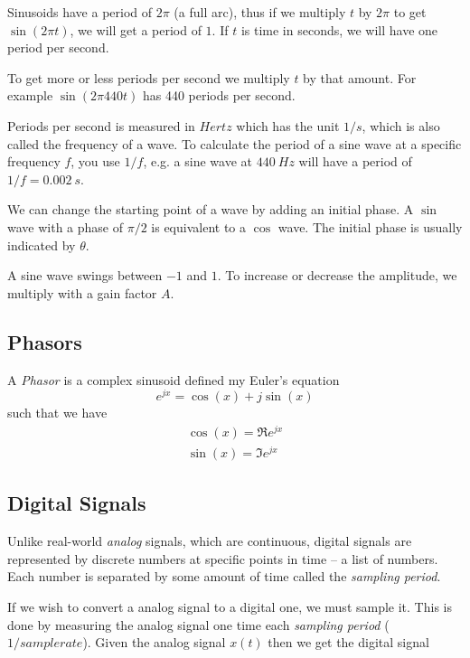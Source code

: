 \documentclass[11pt]{article}
\begin{document}
Sinusoids have a period of $2 \pi$ (a full arc), thus if we multiply $t$ by $2\pi$ to get $\sin(2 \pi t)$, we will get a period of $1$. If $t$ is time in seconds, we will have one period per second.

To get more or less periods per second we multiply $t$ by that amount. For example $\sin(2 \pi 440 t)$ has 440 periods per second.

Periods per second is measured in $Hertz$ which has the unit $1/s$, which is also called the frequency of a wave. To calculate the period of a sine wave at a specific frequency $f$, you use $1/f$, e.g. a sine wave at $440\ Hz$ will have a period of $1/f=0.002\ s$.

We can change the starting point of a wave by adding an initial phase. A $\sin$ wave with a phase of $\pi/2$ is equivalent to a $\cos$ wave. The initial phase is usually indicated by $\theta$.

A sine wave swings between $-1$ and $1$. To increase or decrease the amplitude, we multiply with a gain factor $A$.

\subsection{Phasors}
A \textit{Phasor} is a complex sinusoid defined my Euler's equation
\begin{equation}
    e^{jx} = \cos(x) + j\sin(x)
\end{equation}
such that we have
\begin{align}
    \cos(x) = \Re{e^{jx}}\\
    \sin(x) = \Im{e^{jx}}
\end{align}

\subsection{Digital Signals}
Unlike real-world \textit{analog} signals, which are continuous, digital signals are represented by discrete numbers at specific points in time -- a list of numbers. Each number is separated by some amount of time called the \textit{sampling period}.

If we wish to convert a analog signal to a digital one, we must sample it. This is done by measuring the analog signal one time each \textit{sampling period} ($1/samplerate$). Given the analog signal $x(t)$ then we get the digital signal
\end{document}
